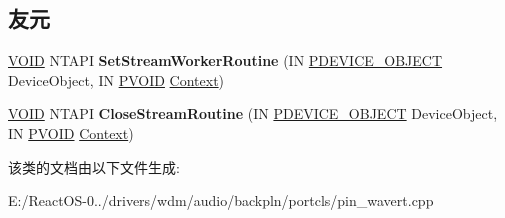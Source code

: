 \subsection*{友元}
\begin{DoxyCompactItemize}
\item 
\mbox{\label{class_c_port_pin_wave_r_t_aee318551eaad53d293037730d3655a7f}} 
\hyperlink{interfacevoid}{V\+O\+ID} N\+T\+A\+PI {\bfseries Set\+Stream\+Worker\+Routine} (IN \hyperlink{struct___d_e_v_i_c_e___o_b_j_e_c_t}{P\+D\+E\+V\+I\+C\+E\+\_\+\+O\+B\+J\+E\+CT} Device\+Object, IN \hyperlink{interfacevoid}{P\+V\+O\+ID} \hyperlink{struct_context}{Context})
\item 
\mbox{\label{class_c_port_pin_wave_r_t_a35890c2761fcbe318f93642220963675}} 
\hyperlink{interfacevoid}{V\+O\+ID} N\+T\+A\+PI {\bfseries Close\+Stream\+Routine} (IN \hyperlink{struct___d_e_v_i_c_e___o_b_j_e_c_t}{P\+D\+E\+V\+I\+C\+E\+\_\+\+O\+B\+J\+E\+CT} Device\+Object, IN \hyperlink{interfacevoid}{P\+V\+O\+ID} \hyperlink{struct_context}{Context})
\end{DoxyCompactItemize}


该类的文档由以下文件生成\+:\begin{DoxyCompactItemize}
\item 
E\+:/\+React\+O\+S-\/0../drivers/wdm/audio/backpln/portcls/pin\+\_\+wavert.\+cpp\end{DoxyCompactItemize}
